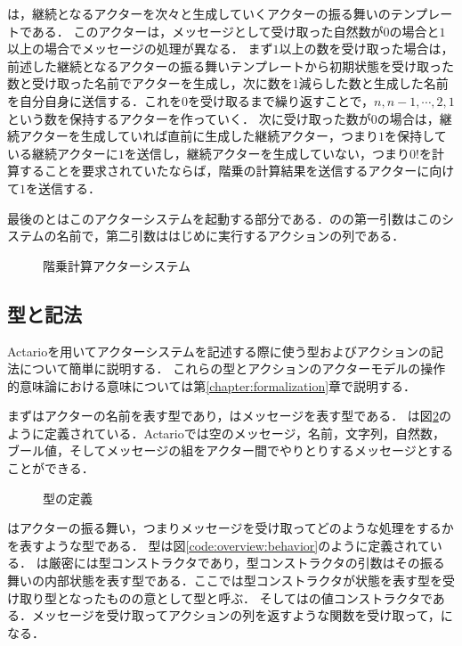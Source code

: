 は，継続となるアクターを次々と生成していくアクターの振る舞いのテンプレートである．
このアクターは，メッセージとして受け取った自然数が$0$の場合と$1$以上の場合でメッセージの処理が異なる．
まず$1$以上の数を受け取った場合は，前述した継続となるアクターの振る舞いテンプレートから初期状態を受け取った数と受け取った名前でアクターを生成し，次に数を$1$減らした数と生成した名前を自分自身に送信する．これを$0$を受け取るまで繰り返すことで，$n, n - 1, \cdots, 2, 1$ という数を保持するアクターを作っていく．
次に受け取った数が$0$の場合は，継続アクターを生成していれば直前に生成した継続アクター，つまり$1$を保持している継続アクターに$1$を送信し，継続アクターを生成していない，つまり$0!$を計算することを要求されていたならば，階乗の計算結果を送信するアクターに向けて$1$を送信する．

最後のとはこのアクターシステムを起動する部分である．のの第一引数はこのシステムの名前で，第二引数ははじめに実行するアクションの列である．

\begin{figure}[tp]
  
  \label{code:overview:fact-impl}
  \caption{階乗計算アクターシステム}
\end{figure}

\subsection{型と記法}

Actarioを用いてアクターシステムを記述する際に使う型およびアクションの記法について簡単に説明する．
これらの型とアクションのアクターモデルの操作的意味論における意味については第\ref{chapter:formalization}章で説明する．

まずはアクターの名前を表す型であり，はメッセージを表す型である．
は図\ref{code:overview:message}のように定義されている．Actarioでは空のメッセージ，名前，文字列，自然数，ブール値，そしてメッセージの組をアクター間でやりとりするメッセージとすることができる．

\begin{figure}
  
  \label{code:overview:message}
  \caption{型の定義}
\end{figure}

はアクターの振る舞い，つまりメッセージを受け取ってどのような処理をするかを表すような型である．
型は図\ref{code:overview:behavior}のように定義されている．
は厳密には型コンストラクタであり，型コンストラクタの引数はその振る舞いの内部状態を表す型である．ここでは型コンストラクタが状態を表す型を受け取り型となったものの意として型と呼ぶ．
そしてはの値コンストラクタである．メッセージを受け取ってアクションの列を返すような関数を受け取って，になる．

